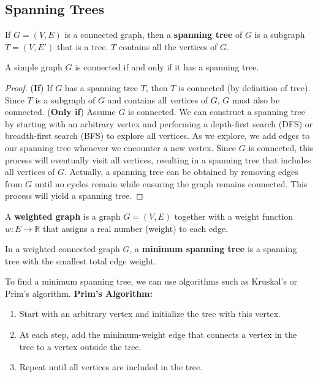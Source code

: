\subsection{Spanning Trees}

\begin{definition}
If $G=(V,E)$ is a connected graph, then a \textbf{spanning tree} of $G$ is a subgraph $T=(V,E')$ that is a tree. $T$ contains all the vertices of $G$.
\end{definition}

\begin{theorem}
A simple graph $G$ is connected if and only if it has a spanning tree.
\end{theorem}

\begin{proof}
(\textbf{If}) If $G$ has a spanning tree $T$, then $T$ is connected (by definition of tree). Since $T$ is a subgraph of $G$ and contains all vertices of $G$, $G$ must also be connected.
(\textbf{Only if}) Assume $G$ is connected. We can construct a spanning tree by starting with an arbitrary vertex and performing a depth-first search (DFS) or breadth-first search (BFS) to explore all vertices. As we explore, we add edges to our spanning tree whenever we encounter a new vertex. Since $G$ is connected, this process will eventually visit all vertices, resulting in a spanning tree that includes all vertices of $G$.
Actually, a spanning tree can be obtained by removing edges from $G$ until no cycles remain while ensuring the graph remains connected. This process will yield a spanning tree.
\end{proof}

\begin{definition}
A \textbf{weighted graph} is a graph $G=(V,E)$ together with a weight function $w: E \to \mathbb{R}$ that assigns a real number (weight) to each edge.
\end{definition}

\begin{definition}
In a weighted connected graph $G$, a \textbf{minimum spanning tree} is a spanning tree with the smallest total edge weight.
\end{definition}

To find a minimum spanning tree, we can use algorithms such as Kruskal's or Prim's algorithm.
\textbf{Prim's Algorithm:}
\begin{enumerate}
    \item Start with an arbitrary vertex and initialize the tree with this vertex.
    \item At each step, add the minimum-weight edge that connects a vertex in the tree to a vertex outside the tree.
    \item Repeat until all vertices are included in the tree.
\end{enumerate}

